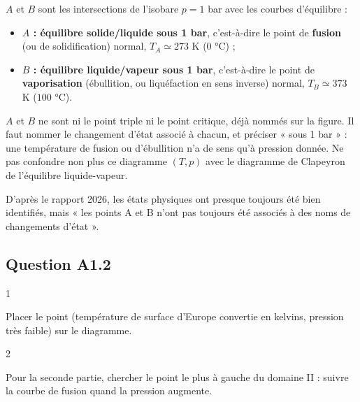 \documentclass[11pt,a4paper]{article}
\providecommand{\tightlist}{\setlength{\itemsep}{0pt}\setlength{\parskip}{0pt}}
\begin{document}
\(A\) et \(B\) sont les intersections de l'isobare \(p = 1\) bar avec les courbes d'équilibre :

\begin{itemize}
\tightlist
\item
  \textbf{\(A\) : équilibre solide/liquide sous 1 bar}, c'est-à-dire le point de \textbf{fusion} (ou de solidification) normal, \(T_A \simeq 273\) K (\(0\) °C) ;
\item
  \textbf{\(B\) : équilibre liquide/vapeur sous 1 bar}, c'est-à-dire le point de \textbf{vaporisation} (ébullition, ou liquéfaction en sens inverse) normal, \(T_B \simeq 373\) K (\(100\) °C).
\end{itemize}

\begin{piege}

\(A\) et \(B\) ne sont ni le point triple ni le point critique, déjà nommés sur la figure. Il faut nommer le changement d'état associé à chacun, et préciser « sous 1 bar » : une température de fusion ou d'ébullition n'a de sens qu'à pression donnée. Ne pas confondre non plus ce diagramme \((T, p)\) avec le diagramme de Clapeyron de l'équilibre liquide-vapeur.

\end{piege}

\begin{jury}

D'après le rapport 2026, les états physiques ont presque toujours été bien identifiés, mais « les points A et B n'ont pas toujours été associés à des noms de changements d'état ».

\end{jury}

\hypertarget{question-a1.2}{%
\subsection{Question A1.2}\label{question-a1.2}}

\begin{indication}{1}

Placer le point (température de surface d'Europe convertie en kelvins, pression très faible) sur le diagramme.

\end{indication}

\begin{indication}{2}

Pour la seconde partie, chercher le point le plus à gauche du domaine II : suivre la courbe de fusion quand la pression augmente.

\end{indication}
\end{document}
